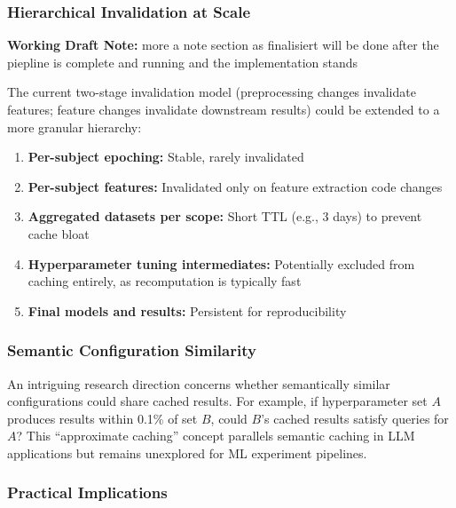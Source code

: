 \documentclass{imc-inf} %
\begin{document}
\subsubsection{Hierarchical Invalidation at Scale}



\begin{center}
\colorbox{yellow!20}{%
\begin{minipage}{0.9\textwidth}
\textbf{Working Draft Note:} 
more a note section as finalisiert will be done after the piepline is complete and running and the implementation stands
\end{minipage}
}
\end{center}

The current two-stage invalidation model (preprocessing changes invalidate features; feature changes invalidate downstream results) could be extended to a more granular hierarchy:

\begin{enumerate}
\item \textbf{Per-subject epoching:} Stable, rarely invalidated
\item \textbf{Per-subject features:} Invalidated only on feature extraction code changes
\item \textbf{Aggregated datasets per scope:} Short TTL (e.g., 3 days) to prevent cache bloat
\item \textbf{Hyperparameter tuning intermediates:} Potentially excluded from caching entirely, as recomputation is typically fast
\item \textbf{Final models and results:} Persistent for reproducibility
\end{enumerate}

\subsubsection{Semantic Configuration Similarity}

An intriguing research direction concerns whether semantically similar configurations could share cached results. For example, if hyperparameter set $A$ produces results within 0.1\% of set $B$, could $B$'s cached results satisfy queries for $A$? This ``approximate caching'' concept parallels semantic caching in LLM applications but remains unexplored for ML experiment pipelines.

\subsubsection{Practical Implications}
\end{document}
